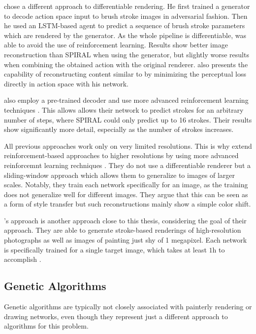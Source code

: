 \citeauthor*{neuralpainters} chose a different approach to differentiable rendering.
He first trained a generator to decode action space input to brush stroke images in adversarial fashion.
Then he used an LSTM-based agent to predict a sequence of brush stroke parameters which are rendered by the generator.
As the whole pipeline is differentiable, \citeauthor{neuralpainters} was able to avoid the use of reinforcement learning.
Results show better image reconstruction than SPIRAL when using the generator, but slightly worse results when combining the obtained action with the original renderer.
\citeauthor{neuralpainters} also presents the capability of reconstructing content similar to \citeauthor{gatys} by minimizing the perceptual loss directly in action space with his network.

\citeauthor*{learning2paint} also employ a pre-trained decoder and use more advanced reinforcement learning techniques \cite{learning2paint}.
This allows allows their network to predict strokes for an arbitrary number of steps, where SPIRAL could only predict up to 16 strokes.
Their results show significantly more detail, especially as the number of strokes increases.

All previous approaches work only on very limited resolutions.
This is why \citeauthor*{paintbot} extend reinforcement-based approaches to higher resolutions by using more advanced reinforcemnt learning rechniques \cite{paintbot, LpaintB}.
They do not use a differentiable renderer but a sliding-window approach which allows them to generalize to images of larger scales.
Notably, they train each network specifically for an image, as the training does not generalize well for different images.
They argue that this can be seen as a form of style transfer but such reconstructions mainly show a simple color shift.

\citeauthor*{LpaintB}'s approach is another approach close to this thesis, considering the goal of their approach.
They are able to generate stroke-based renderings of high-resolution photographs as well as images of painting just shy of 1 megapixel.
Each network is specifically trained for a single target image, which takes at least $1 \si{\hour}$ to accomplish \cite{paintbot}.


\subsection{Genetic Algorithms}
Genetic algorithms are typically not closely associated with painterly rendering or drawing networks, even though they represent just a different approach to algorithms for this problem.

